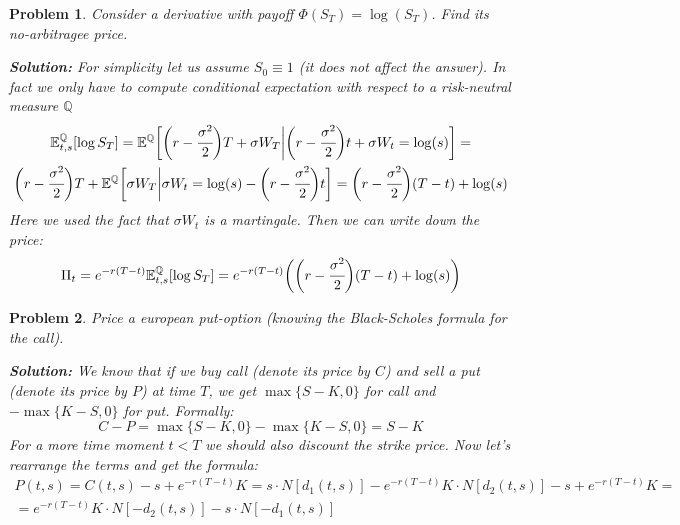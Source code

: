 \documentclass[a4paper, 12pt]{article}
\theoremstyle{problemstyle}
\newtheorem{problem}{Problem}[section]
\newenvironment{solution}
{\textit{\textbf{Solution:}}}
{}
\newcommand{\E}{\mathbb{E}}
\begin{document}
\begin{problem}
	Consider a derivative with payoff $\Phi(S_T) = \log(S_T)$. Find its no-arbitragee price.
	
	\begin{solution}
		For simplicity let us assume $S_0 \equiv 1$ (it does not affect the answer). In fact we only have to compute conditional expectation with respect to a risk-neutral measure $\mathbb{Q}$
		\begin{multline}
		\E^{\mathbb{Q}}_{t, s}[\log S_T] = 
		\E^{\mathbb{Q}}\bigg[ 
		\bigg(r  - \cfrac{\sigma^2}{2}\bigg)T + \sigma W_T \bigg| 
		\bigg(r  - \cfrac{\sigma^2}{2}\bigg)t + \sigma W_t = \log(s)
		\bigg] = \\
		\bigg(r  - \cfrac{\sigma^2}{2}\bigg)T  +
		\E^{\mathbb{Q}}\bigg[ \sigma W_T \bigg| 
		\sigma W_t = \log(s) - \bigg(r  - \cfrac{\sigma^2}{2}\bigg)t 
		\bigg] = 
			\bigg(r  - \cfrac{\sigma^2}{2}\bigg)(T-t) +\log(s) 
		\end{multline}
		Here we used the fact that $\sigma W_t$ is a martingale. Then we can write down the price:
		\begin{equation}
		\Pi_t = e^{-r(T-t)}\E^{\mathbb{Q}}_{t, s}[\log S_T]  = e^{-r(T-t)}\bigg(\bigg(r  - \cfrac{\sigma^2}{2}\bigg)(T-t) +\log(s)\bigg) 
		\end{equation}
	\end{solution}
\end{problem}

\begin{problem}
		Price a european put-option (knowing the Black-Scholes formula for the call).
	
	\begin{solution}
		We know that if we buy call (denote its price by $C$) and sell a put (denote its price by $P$) at time $T$, we get $\max\{S-K, 0\}$ for call and $-\max\{K-S, 0\}$  for put.  Formally:
		\begin{equation}
		C - P = \max\{S-K, 0\} - \max\{K-S, 0\} = S - K%
		\end{equation}
		For a more time moment $t < T$ we should also discount the strike price. Now let's rearrange the terms and get the formula:
		\begin{multline}
		P(t, s)  = C (t, s)- s+e^{-r(T-t)}K = 
		 s \cdot N[d_1(t, s)] - e^{-r(T-t)}K \cdot N[d_2(t, s)]  - s + e^{-r(T-t)}K = \\
		 = e^{-r(T-t)}K \cdot N[-d_2(t, s)]  - s \cdot N[-d_1(t, s)]
		\end{multline}
	\end{solution}
\end{problem}
\end{document}
